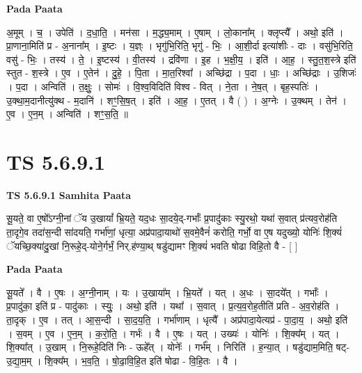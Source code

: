 \documentclass[17pt]{extarticle}
\begin{document}
\textbf{Pada Paata} \newline

अ॒मूम् । च॒ । उपेति॑ । द॒धा॒ति॒ । मन॑सा । म॒द्ध्य॒माम् । ए॒षाम् । लो॒काना᳚म् । क्लृप्त्यै᳚ । अथो॒ इति॑ । प्रा॒णाना॒मिति॑ प्र - अ॒नाना᳚म् । इ॒ष्टः । य॒ज्ञ्ः । भृगु॑भि॒रिति॒ भृगु॑ - भिः॒ । आ॒शी॒र्दा इत्या॑शीः - दाः । वसु॑भि॒रिति॒ वसु॑ - भिः॒ । तस्य॑ । ते॒ । इ॒ष्टस्य॑ । वी॒तस्य॑ । द्रवि॑णा । इ॒ह । भ॒क्षी॒य॒ । इति॑ । आ॒ह॒ । स्तु॒त॒श॒स्त्रे इति॑ स्तुत - श॒स्त्रे । ए॒व । ए॒तेन॑ । दु॒हे॒ । पि॒ता । मा॒त॒रिश्वा᳚ । अच्छि॑द्रा । प॒दा । धाः॒ । अच्छि॑द्राः । उ॒शिजः॑ । प॒दा । अन्विति॑ । त॒क्षुः॒ । सोमः॑ । वि॒श्व॒विदिति॑ विश्व - वित् । ने॒ता । ने॒ष॒त् । बृह॒स्पतिः॑ । उ॒क्था॒म॒दानीत्यु॑क्थ - म॒दानि॑ । शꣳ॒॒सि॒ष॒त् । इति॑ । आ॒ह॒ । ए॒तत् । वै ( ) । अ॒ग्नेः । उ॒क्थम् । तेन॑ । ए॒व । ए॒न॒म् । अन्विति॑ । शꣳ॒॒स॒ति॒ ॥  \newline





\section{ TS 5.6.9.1 }

\textbf{TS 5.6.9.1 } \newline
\textbf{Samhita Paata} \newline

सू॒यते॒ वा ए॒षो᳚ऽग्नी॒नां ॅय उ॒खायां᳚ भ्रि॒यते॒ यद॒धः सा॒दये॒द्-गर्भाः᳚ प्र॒पादु॑काः स्यु॒रथो॒ यथा॑ स॒वात् प्र॑त्यव॒रोह॑ति ता॒दृगे॒व तदा॑स॒न्दी सा॑दयति॒ गर्भा॑णां॒ धृत्या॒ अप्र॑पादा॒याथो॑ स॒वमे॒वैनं॑ करोति॒ गर्भो॒ वा ए॒ष यदुख्यो॒ योनिः॑ शि॒क्यं॑ ॅयच्छि॒क्या॑दु॒खां नि॒रूहे॒द्-योने॒र्गर्भं॒ निर्.ह॑ण्या॒थ् षडु॑द्यामꣳ शि॒क्यं॑ भवति षोढा विहि॒तो वै - [  ] \newline

\textbf{Pada Paata} \newline

सू॒यते᳚ । वै । ए॒षः । अ॒ग्नी॒नाम् । यः । उ॒खाया᳚म् । भ्रि॒यते᳚ । यत् । अ॒धः । सा॒दये᳚त् । गर्भाः᳚ । प्र॒पादु॑का॒ इति॑ प्र - पादु॑काः । स्युः॒ । अथो॒ इति॑ । यथा᳚ । स॒वात् । प्र॒त्य॒व॒रोह॒तीति॑ प्रति - अ॒व॒रोह॑ति । ता॒दृक् । ए॒व । तत् । आ॒स॒न्दी । सा॒द॒य॒ति॒ । गर्भा॑णाम् । धृत्यै᳚ । अप्र॑पादा॒येत्यप्र॑ - पा॒दा॒य॒ । अथो॒ इति॑ । स॒वम् । ए॒व । ए॒न॒म् । क॒रो॒ति॒ । गर्भः॑ । वै । ए॒षः । यत् । उख्यः॑ । योनिः॑ । शि॒क्य᳚म् । यत् । शि॒क्या᳚त् । उ॒खाम् । नि॒रूहे॒दिति॑ निः - ऊहे᳚त् । योनेः᳚ । गर्भ᳚म् । निरिति॑ । ह॒न्या॒त् । षडु॑द्याम॒मिति॒ षट्-उ॒द्या॒म॒म् । शि॒क्य᳚म् । भ॒व॒ति॒ । षो॒ढा॒वि॒हि॒त इति॑ षोढा - वि॒हि॒तः । वै ।  \newline
\end{document}
